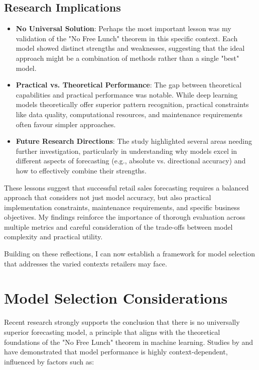 \documentclass[12pt,a4paper]{report}
\begin{document}
\subsection{Research Implications}
\begin{itemize}
    \item \textbf{No Universal Solution}: Perhaps the most important lesson was my validation of the "No Free Lunch" theorem in this specific context. Each model showed distinct strengths and weaknesses, suggesting that the ideal approach might be a combination of methods rather than a single "best" model.
    
    \item \textbf{Practical vs. Theoretical Performance}: The gap between theoretical capabilities and practical performance was notable. While deep learning models theoretically offer superior pattern recognition, practical constraints like data quality, computational resources, and maintenance requirements often favour simpler approaches.
    
    \item \textbf{Future Research Directions}: The study highlighted several areas needing further investigation, particularly in understanding why models excel in different aspects of forecasting (e.g., absolute vs. directional accuracy) and how to effectively combine their strengths.
\end{itemize}

These lessons suggest that successful retail sales forecasting requires a balanced approach that considers not just model accuracy, but also practical implementation constraints, maintenance requirements, and specific business objectives. My findings reinforce the importance of thorough evaluation across multiple metrics and careful consideration of the trade-offs between model complexity and practical utility.

Building on these reflections, I can now establish a framework for model selection that addresses the varied contexts retailers may face.

\section{Model Selection Considerations}
Recent research strongly supports the conclusion that there is no universally superior forecasting model, a principle that aligns with the theoretical foundations of the "No Free Lunch" theorem in machine learning. \sloppy Studies by \citet{makridakis2020m4} and \citet{petropoulos2022forecasting} have demonstrated that model performance is highly context-dependent, influenced by factors such as:
\fussy
\end{document}
